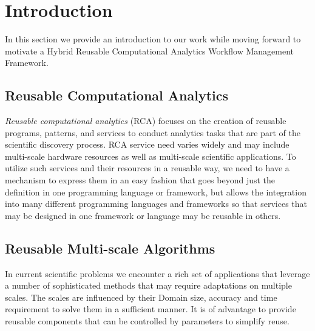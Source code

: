 \documentclass[sigplan,screen]{acmart}
\newcommand{\FILE}[1]{}
\begin{document}





\maketitle

% 

\FILE{cc.tex}

\section{Introduction}

In this section we provide an introduction to our work while
moving forward to motivate a 
Hybrid Reusable Computational Analytics Workflow
Management Framework.

\subsection{Reusable Computational Analytics}

{\em Reusable computational analytics} (RCA) focuses on the creation
of reusable programs, patterns, and services to conduct analytics
tasks that are part of the scientific discovery process. RCA service
need varies widely and may include multi-scale hardware resources as
well as multi-scale scientific applications. To utilize such services
and their resources in a reusable way, we need to have a mechanism to
express them in an easy fashion that goes beyond just the definition
in one programming language or framework, but allows the integration
into many different programming languages and frameworks so that
services that may be designed in one framework or language may be
reusable in others.

\subsection{Reusable Multi-scale Algorithms}

In current scientific problems we encounter a rich set of applications
that leverage a number of sophisticated methods that may require
adaptations on multiple scales. The scales are influenced by their
Domain size, accuracy and time requirement to solve them in a
sufficient manner. It is of advantage to provide reusable components
that can be controlled by parameters to simplify reuse.
\end{document}
